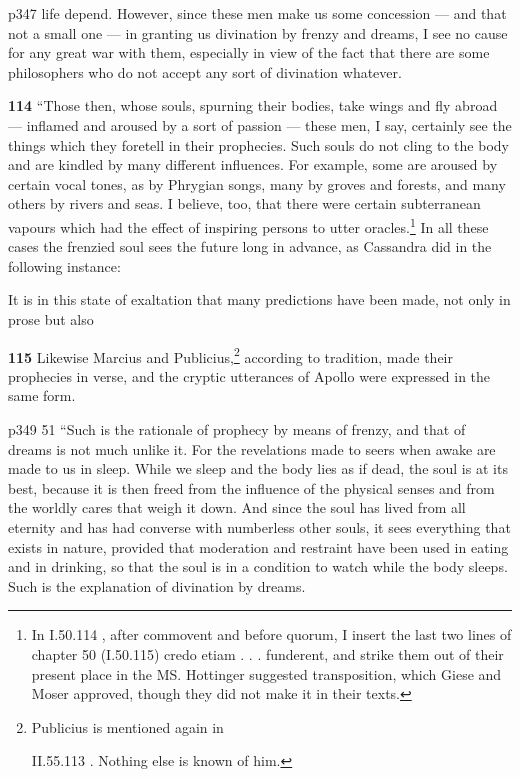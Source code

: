 p347 life depend. However, since these men make us some concession \texthebrew{—} and that not a small one \texthebrew{—} in granting us divination by frenzy and dreams, I see no cause for any great war with them, especially in view of the fact that there are some philosophers who do not accept any sort of divination whatever.

\textbf{114} ``Those then, whose souls, spurning their bodies, take wings and fly abroad \texthebrew{—} inflamed and aroused by a sort of passion \texthebrew{—} these men, I say, certainly see the things which they foretell in their prophecies. Such souls do not cling to the body and are kindled by many different influences. For example, some are aroused by certain vocal tones, as by Phrygian songs, many by groves and forests, and many others by rivers and seas. I believe, too, that there were certain subterranean vapours which had the effect of inspiring persons to utter oracles.\texthebrew{}\footnote{In I.50.114 , after commovent and before quorum, I insert the last two lines of chapter 50 (I.50.115) credo etiam . . . funderent, and strike them out of their present place in the MS. Hottinger suggested transposition, which Giese and Moser approved, though they did not make it in their texts.

} In all these cases the frenzied soul sees the future long in advance, as Cassandra did in the following instance:

It is in this state of exaltation that many predictions have been made, not only in prose but also

\textbf{115} Likewise Marcius and Publicius,\texthebrew{}\footnote{Publicius is mentioned again in

II.55.113 . Nothing else is known of him.

} according to tradition, made their prophecies in verse, and the cryptic utterances of Apollo were expressed in the same form.

p349
51
``Such is the rationale of prophecy by means of frenzy, and that of dreams is not much unlike it. For the revelations made to seers when awake are made to us in sleep. While we sleep and the body lies as if dead, the soul is at its best, because it is then freed from the influence of the physical senses and from the worldly cares that weigh it down. And since the soul has lived from all eternity and has had converse with numberless other souls, it sees everything that exists in nature, provided that moderation and restraint have been used in eating and in drinking, so that the soul is in a condition to watch while the body sleeps. Such is the explanation of divination by dreams.

